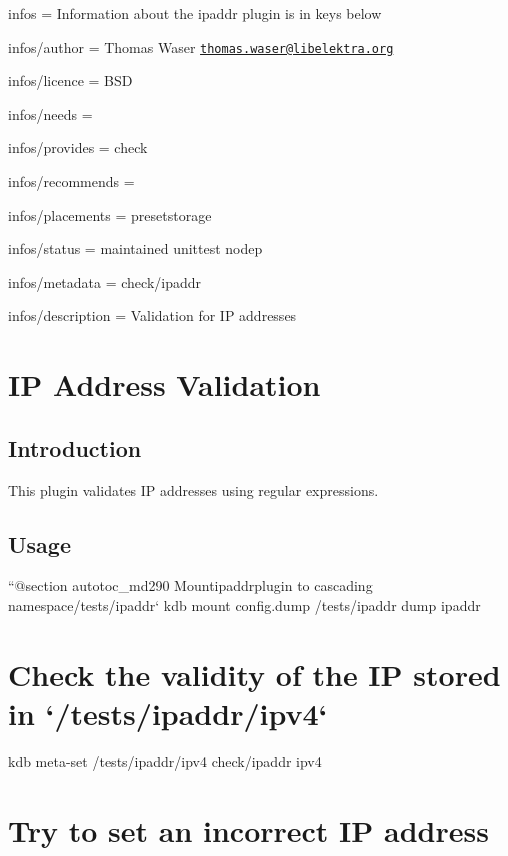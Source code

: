 
\begin{DoxyItemize}
\item infos = Information about the ipaddr plugin is in keys below
\item infos/author = Thomas Waser \href{mailto:thomas.waser@libelektra.org}{\tt thomas.\+waser@libelektra.\+org}
\item infos/licence = B\+SD
\item infos/needs =
\item infos/provides = check
\item infos/recommends =
\item infos/placements = presetstorage
\item infos/status = maintained unittest nodep
\item infos/metadata = check/ipaddr
\item infos/description = Validation for IP addresses
\end{DoxyItemize}\hypertarget{autotoc_md287_src_plugins_ipaddr_README_md}{}\section{I\+P Address Validation}\label{autotoc_md287_src_plugins_ipaddr_README_md}
\hypertarget{autotoc_md287_autotoc_md288}{}\subsection{Introduction}\label{autotoc_md287_autotoc_md288}
This plugin validates IP addresses using regular expressions.\hypertarget{autotoc_md287_autotoc_md289}{}\subsection{Usage}\label{autotoc_md287_autotoc_md289}
``{\ttfamily  @section autotoc\+\_\+md290 Mount}ipaddr{\ttfamily plugin to cascading namespace}/tests/ipaddr` kdb mount config.\+dump /tests/ipaddr dump ipaddr\hypertarget{autotoc_md287_autotoc_md291}{}\section{Check the validity of the I\+P stored in `/tests/ipaddr/ipv4`}\label{autotoc_md287_autotoc_md291}
kdb meta-\/set /tests/ipaddr/ipv4 check/ipaddr ipv4\hypertarget{autotoc_md287_autotoc_md292}{}\section{Try to set an incorrect I\+P address}\label{autotoc_md287_autotoc_md292}
